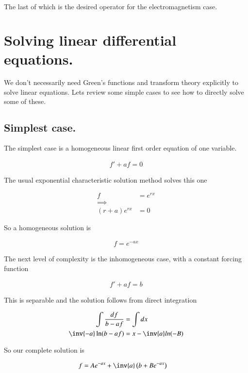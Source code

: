 The last of which is the desired operator for the electromagnetism case.

\section{Solving linear differential equations. }

We don't necessarily need Green's functions and transform theory explicitly
to solve linear equations.  Lets review some simple cases to see how to 
directly solve some of these.

\subsection{Simplest case. }

The simplest case is a homogeneous linear first order equation of one variable.

\begin{align*}
f' + a f = 0
\end{align*}

The usual exponential characteristic solution method solves this one

\begin{align*}
f &= e^{rx} \\
\implies \\
(r + a) e^{rx} &= 0
\end{align*}

So a homogeneous solution is

\begin{align*}
f = e^{-ax}
\end{align*}

The next level of complexity is the inhomogeneous case, with a constant forcing function

\begin{align*}
f' + a f = b
\end{align*}

This is separable and the solution follows from direct integration

\begin{align*}
\int \frac{df}{b - a f} &= \int dx \\
\inv{-a}\ln(b - af) &= x - \inv{a} ln(-B) \\
\end{align*}

So our complete solution is

\begin{align*}
f &= A e^{-ax} + \inv{a}\left(b + B e^{-a x}\right)
\end{align*}

